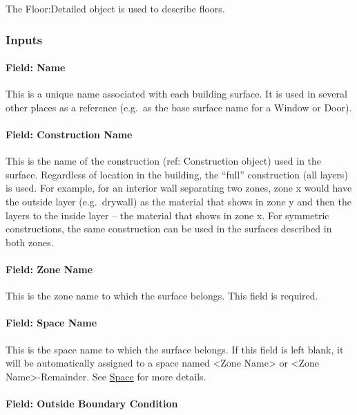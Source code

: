 The Floor:Detailed object is used to describe floors.

\subsubsection{Inputs}\label{inputs-22-006}

\paragraph{Field: Name}\label{field-name-18-008}

This is a unique name associated with each building surface. It is used in several other places as a reference (e.g.~as the base surface name for a Window or Door).

\paragraph{Field: Construction Name}\label{field-construction-name-18}

This is the name of the construction (ref: Construction object) used in the surface. Regardless of location in the building, the ``full'' construction (all layers) is used. For example, for an interior wall separating two zones, zone x would have the outside layer (e.g.~drywall) as the material that shows in zone y and then the layers to the inside layer -- the material that shows in zone x. For symmetric constructions, the same construction can be used in the surfaces described in both zones.

\paragraph{Field: Zone Name}\label{field-zone-name-12-000}

This is the zone name to which the surface belongs. This field is required.

\paragraph{Field: Space Name}\label{field-space-name-12-000}

This is the space name to which the surface belongs. If this field is left blank, it will be automatically assigned to a space named <Zone Name> or <Zone Name>-Remainder. See \hyperref[space]{Space} for more details.

\paragraph{Field: Outside Boundary Condition}\label{field-outside-boundary-condition-2}

